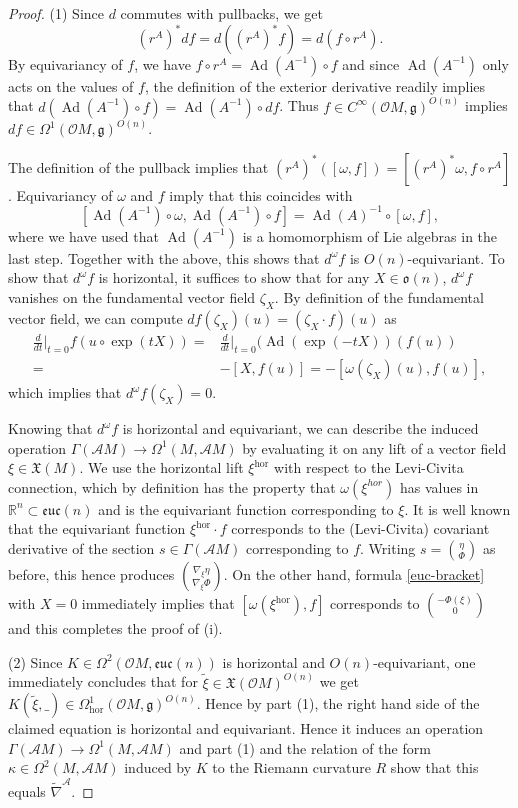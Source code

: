 \documentclass[12pt,a4paper]{amsart}
\def\frak{\mathfrak}
\def\Bbb{\mathbb}
\def\Cal{\mathcal}
\renewcommand{\o}{\circ}
\newcommand{\ka}{\kappa}
\newcommand{\om}{\omega}
\newcommand{\ze}{\zeta}
\newcommand{\Ga}{\Gamma}
\newcommand{\Ph}{\Phi}
\newcommand{\Om}{\Omega}
\newcommand{\Ad}{\operatorname{Ad}}
\newcommand{\euc}{\mathfrak{euc}}
\newcommand{\tn}{\widetilde{\nabla}}
\newcommand{\hor}{\text{hor}}
\numberwithin{theorem}{section}
\numberwithin{equation}{section}
\theoremstyle{definition}
\theoremstyle{remark}
\begin{document}
\begin{proof}
  (1) Since $d$ commutes with pullbacks, we get
  $$
  (r^A)^*df=d((r^A)^*f)=d(f\o r^A).
  $$
  By equivariancy of $f$, we have $f\o r^A=\Ad(A^{-1})\o f$ and since
  $\Ad(A^{-1})$ only acts on the values of $f$, the definition of the exterior
  derivative readily implies that $d(\Ad(A^{-1})\o f)=\Ad(A^{-1})\o df$. Thus $f\in
  C^{\infty}(\Cal OM,\frak g)^{O(n)}$ implies $df\in\Om^1(\Cal OM,\frak g)^{O(n)}$.

  The definition of the pullback implies that $(r^A)^*([\om,f])=[(r^A)^*\om,f\o
    r^A]$. Equivariancy of $\om$ and $f$ imply that this coincides with
  $$
  [\Ad(A^{-1})\o \om,\Ad(A^{-1})\o f]=\Ad(A)^{-1}\o [\om,f],
  $$ where we have used that $\Ad(A^{-1})$ is a homomorphism of Lie algebras in the
  last step. Together with the above, this shows that $d^\om f$ is
  $O(n)$-equivariant. To show that $d^\om f$ is horizontal, it suffices to show that
  for any $X\in\frak o(n)$, $d^{\om} f$ vanishes on the fundamental vector field
  $\ze_X$. By definition of the fundamental vector field, we can compute
  $df(\ze_X)(u)=(\ze_X\cdot f)(u)$ as
  \begin{align*}
  \tfrac{d}{dt}|_{t=0}f(u\o\exp(tX))=&
  \tfrac{d}{dt}|_{t=0}(\Ad(\exp(-tX))(f(u))\\ =&-[X,f(u)]=-[\om(\ze_X)(u),f(u)], 
  \end{align*}
  which implies that $d^\om f(\ze_X)=0$.

  Knowing that $d^{\om}f$ is horizontal and equivariant, we can describe the induced
  operation $\Ga(\Cal AM)\to \Om^1(M,\Cal AM)$ by evaluating it on any lift of a
  vector field $\xi\in\frak X(M)$. We use the horizontal lift $\xi^{\hor}$ with
  respect to the Levi-Civita connection, which by definition has the property that
  $\om(\xi^{hor})$ has values in $\Bbb R^n\subset\euc(n)$ and is the equivariant
  function corresponding to $\xi$. It is well known that the equivariant function
  $\xi^{\hor}\cdot f$ corresponds to the (Levi-Civita) covariant derivative of the
  section $s\in\Ga(\Cal AM)$ corresponding to $f$. Writing $s=\binom{\eta}{\Phi}$ as
  before, this hence produces $\binom{\nabla_{\xi}\eta}{\nabla_\xi\Phi}$. On the
  other hand, formula \eqref{euc-bracket} with $X=0$ immediately implies that
  $[\om(\xi^\hor),f]$ corresponds to $\binom{-\Ph(\xi)}{0}$ and this completes the
  proof of (i).

(2) Since $K\in\Om^2(\Cal OM,\euc(n))$ is horizontal and $O(n)$-equivariant, one
  immediately concludes that for $\tilde\xi\in\frak X(\Cal OM)^{O(n)}$ we get
  $K(\tilde\xi,\_ )\in\Om^1_{\hor}(\Cal OM,\frak g)^{O(n)}$. Hence by part (1), the
  right hand side of the claimed equation is horizontal and equivariant. Hence it
  induces an operation $\Ga(\Cal AM)\to \Om^1(M,\Cal AM)$ and part (1) and the
  relation of the form $\ka\in\Om^2(M,\Cal AM)$ induced by $K$ to the Riemann
  curvature $R$ show that this equals $\tn^{\Cal A}$.


\end{proof}
\end{document}
